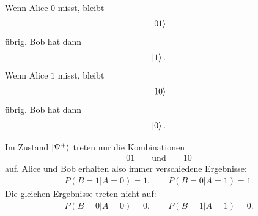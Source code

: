 \documentclass[11pt,a4paper]{scrartcl}
\begin{document}
\begin{enumerate}[label=(\alph*)]
\begin{calculationbox}
            \begin{calculationbox}[title=Zustand von Bob nach Alices Messung]
                Wenn Alice $0$ misst, bleibt
                \begin{align*}
                    \ket{01}
                \end{align*}
                übrig. Bob hat dann
                \begin{align*}
                    \ket{1}.
                \end{align*}
                Wenn Alice $1$ misst, bleibt
                \begin{align*}
                    \ket{10}
                \end{align*}
                übrig. Bob hat dann
                \begin{align*}
                    \ket{0}.
                \end{align*}
            \end{calculationbox}

            \begin{calculationbox}[title=Korrelation]
                Im Zustand $\ket{\Psi^+}$ treten nur die Kombinationen
                \begin{align*}
                    01
                    \qquad
                    \text{und}
                    \qquad
                    10
                \end{align*}
                auf. Alice und Bob erhalten also immer verschiedene Ergebnisse:
                \begin{align*}
                    P(B=1|A=0)=1,
                    \qquad
                    P(B=0|A=1)=1.
                \end{align*}
                Die gleichen Ergebnisse treten nicht auf:
                \begin{align*}
                    P(B=0|A=0)=0,
                    \qquad
                    P(B=1|A=1)=0.
                \end{align*}
            \end{calculationbox}


\end{calculationbox}
\end{enumerate}
\end{document}
